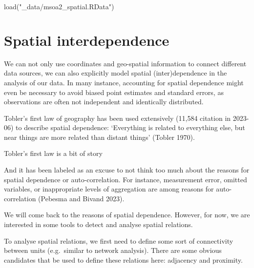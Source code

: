\documentclass[
  letterpaper,
  DIV=11,
  numbers=noendperiod]{scrreprt}
\newenvironment{Shaded}{\begin{snugshade}}{\end{snugshade}}
\newcommand{\FunctionTok}[1]{\textcolor[rgb]{0.28,0.35,0.67}{#1}}
\newcommand{\NormalTok}[1]{\textcolor[rgb]{0.00,0.23,0.31}{#1}}
\newcommand{\StringTok}[1]{\textcolor[rgb]{0.13,0.47,0.30}{#1}}
\begin{document}
\begin{Shaded}
\begin{Highlighting}[]
\FunctionTok{load}\NormalTok{(}\StringTok{"\_data/msoa2\_spatial.RData"}\NormalTok{)}
\end{Highlighting}
\end{Shaded}

\hypertarget{spatial-interdependence}{%
\section{Spatial interdependence}\label{spatial-interdependence}}

We can not only use coordinates and geo-spatial information to connect
different data sources, we can also explicitly model spatial
(inter)dependence in the analysis of our data. In many instance,
accounting for spatial dependence might even be necessary to avoid
biased point estimates and standard errors, as observations are often
not independent and identically distributed.

Tobler's first law of geography has been used extensively (11,584
citation in 2023-06) to describe spatial dependence: `Everything is
related to everything else, but near things are more related than
distant things' (Tobler 1970).

\begin{tcolorbox}[enhanced jigsaw, opacitybacktitle=0.6, left=2mm, leftrule=.75mm, toptitle=1mm, breakable, colback=white, bottomrule=.15mm, colframe=quarto-callout-note-color-frame, colbacktitle=quarto-callout-note-color!10!white, coltitle=black, bottomtitle=1mm, titlerule=0mm, title=\textcolor{quarto-callout-note-color}{\faInfo}\hspace{0.5em}{Note}, opacityback=0, arc=.35mm, rightrule=.15mm, toprule=.15mm]

Tobler's first law is a bit of story

And it has been labeled as an excuse to not think too much about the
reasons for spatial dependence or auto-correlation. For instance,
measurement error, omitted variables, or inappropriate levels of
aggregation are among reasons for auto-correlation (Pebesma and Bivand
2023).

\end{tcolorbox}

We will come back to the reasons of spatial dependence. However, for
now, we are interested in some tools to detect and analyse spatial
relations.

To analyse spatial relations, we first need to define some sort of
connectivity between units (e.g.~similar to network analysis). There are
some obvious candidates that be used to define these relations here:
adjacency and proximity.
\end{document}
